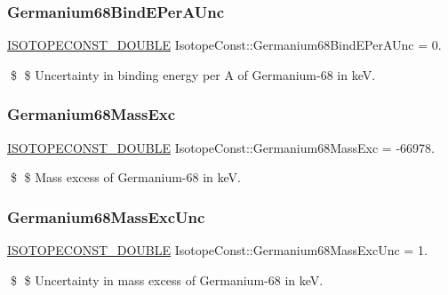 \subsubsection{\texorpdfstring{Germanium68\+Bind\+E\+Per\+A\+Unc}{Germanium68BindEPerAUnc}}
{\footnotesize\ttfamily \mbox{\hyperlink{group___isotope_const-_macros_ga8f45a7272ce02c0b4c65c44636ed719a}{I\+S\+O\+T\+O\+P\+E\+C\+O\+N\+S\+T\+\_\+\+D\+O\+U\+B\+LE}} Isotope\+Const\+::\+Germanium68\+Bind\+E\+Per\+A\+Unc = 0.}

\$ \$ Uncertainty in binding energy per A of Germanium-\/68 in keV. \mbox{\label{group___isotope_const-_germanium-_ge68_gaa4a026eab67fe49c35955227b09d12d5}} 
\subsubsection{\texorpdfstring{Germanium68\+Mass\+Exc}{Germanium68MassExc}}
{\footnotesize\ttfamily \mbox{\hyperlink{group___isotope_const-_macros_ga8f45a7272ce02c0b4c65c44636ed719a}{I\+S\+O\+T\+O\+P\+E\+C\+O\+N\+S\+T\+\_\+\+D\+O\+U\+B\+LE}} Isotope\+Const\+::\+Germanium68\+Mass\+Exc = -\/66978.}

\$ \$ Mass excess of Germanium-\/68 in keV. \mbox{\label{group___isotope_const-_germanium-_ge68_gaf1e0aa78534117069d43817e8882bc90}} 
\subsubsection{\texorpdfstring{Germanium68\+Mass\+Exc\+Unc}{Germanium68MassExcUnc}}
{\footnotesize\ttfamily \mbox{\hyperlink{group___isotope_const-_macros_ga8f45a7272ce02c0b4c65c44636ed719a}{I\+S\+O\+T\+O\+P\+E\+C\+O\+N\+S\+T\+\_\+\+D\+O\+U\+B\+LE}} Isotope\+Const\+::\+Germanium68\+Mass\+Exc\+Unc = 1.}

\$ \$ Uncertainty in mass excess of Germanium-\/68 in keV. \mbox{\label{group___isotope_const-_germanium-_ge68_ga19f78e45483c1b572173e0bebcb7afec}} 
